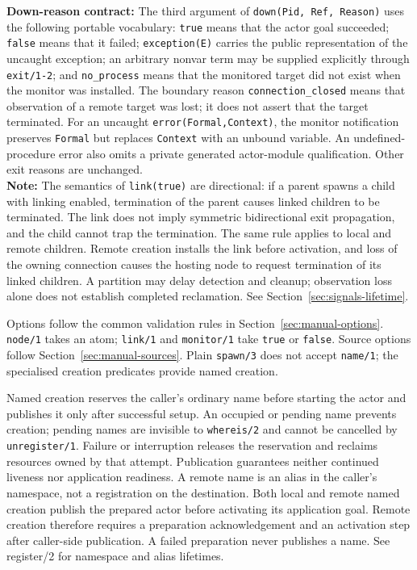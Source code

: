 \smallskip
\noindent \textbf{Down-reason contract:} The third argument of
\texttt{down(\allowbreak{}Pid,\allowbreak{}\,\allowbreak{}Ref,\allowbreak{}\,\allowbreak{}Reason)} uses the following portable vocabulary:
\texttt{true} means that the actor goal succeeded; \texttt{false} means that it
failed; \texttt{exception(\allowbreak{}E)} carries the public representation of the
uncaught exception; an arbitrary nonvar term may be supplied explicitly
through \texttt{exit/\allowbreak{}1-2}; and \texttt{no\_\allowbreak{}process} means that the monitored target
did not exist when the monitor was installed. The boundary reason
\texttt{connection\_\allowbreak{}closed} means that observation of a remote target was lost; it
does not assert that the target terminated. For an
uncaught \texttt{error(\allowbreak{}Formal,\allowbreak{}Context)}, the monitor notification
preserves \texttt{Formal} but replaces \texttt{Context} with an unbound
variable. An undefined-procedure error also omits a private generated
actor-module qualification. Other exit reasons are unchanged.\\

\smallskip
\noindent \textbf{Note:} The semantics of \texttt{link(\allowbreak{}true)} are directional:
if a parent spawns a child with linking enabled, termination of the parent
causes linked children to be terminated. The link does not imply symmetric
bidirectional exit propagation, and the child cannot trap the termination.
The same rule applies to local and remote children. Remote creation installs
the link before activation, and loss of the owning connection causes the
hosting node to request termination of its linked children. A partition may
delay detection and cleanup; observation loss alone does not establish
completed reclamation. See Section~\ref{sec:signals-lifetime}.



Options follow the common validation rules in Section~\ref{sec:manual-options}.
\texttt{node/\allowbreak{}1} takes an atom; \texttt{link/\allowbreak{}1} and
\texttt{monitor/\allowbreak{}1} take \texttt{true} or \texttt{false}.
Source options follow Section~\ref{sec:manual-sources}.
Plain \texttt{spawn/\allowbreak{}3} does not accept \texttt{name/\allowbreak{}1};
the specialised creation predicates provide named creation.

Named creation reserves the caller's ordinary name before starting the actor and publishes it only
after successful setup. An occupied or pending name prevents creation; pending names are invisible
to \texttt{whereis/\allowbreak{}2} and cannot be cancelled by \texttt{unregister/\allowbreak{}1}. Failure or interruption
releases the reservation and reclaims resources owned by that attempt. Publication guarantees
neither continued liveness nor application readiness. A remote name is an alias in the caller's
namespace, not a registration on the destination. Both local and remote
named creation publish the prepared actor before activating its application
goal. Remote creation therefore requires a preparation acknowledgement and
an activation step after caller-side publication. A failed preparation never
publishes a name. See register/2 for namespace and alias lifetimes.

